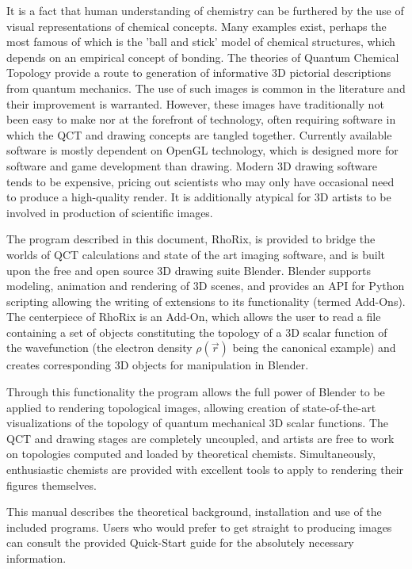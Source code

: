\documentclass{tufte-book}
\newcommand{\programName}{RhoRix}
\begin{document}
It is a fact that human understanding of chemistry can be furthered by the use of visual representations of chemical concepts. Many examples exist, perhaps the most famous of which is the 'ball and stick' model of chemical structures, which depends on an empirical concept of bonding. The theories of Quantum Chemical Topology provide a route to generation of informative 3D pictorial descriptions from quantum mechanics. The use of such images is common in the literature and their improvement is warranted.
However, these images have traditionally not been easy to make nor at the forefront of technology, often requiring software in which the QCT and drawing concepts are tangled together. Currently available software is mostly dependent on OpenGL technology, which is designed more for software and game development than drawing. Modern 3D drawing software tends to be expensive, pricing out scientists who may only have occasional need to produce a high-quality render. It is additionally atypical for 3D artists to be involved in production of scientific images.
\par{}
The program described in this document, \programName{}, is provided to bridge the worlds of QCT calculations and state of the art imaging software, and is built upon the free and open source 3D drawing suite Blender. Blender supports modeling, animation and rendering of 3D scenes, and provides an API for Python scripting allowing the writing of extensions to its functionality (termed Add-Ons). The centerpiece of \programName{} is an Add-On, which allows the user to read a file containing a set of objects constituting the topology of a 3D scalar function of the wavefunction (the electron density $\rho(\vec{r})$ being the canonical example) and creates corresponding 3D objects for manipulation in Blender.
\par{}
Through this functionality the program allows the full power of Blender to be applied to rendering topological images,
allowing creation of state-of-the-art visualizations of the topology of quantum mechanical 3D scalar functions. The QCT and drawing stages are completely uncoupled, and artists are free to work on topologies computed and loaded by theoretical chemists. Simultaneously, enthusiastic chemists are provided with excellent tools to apply to rendering their figures themselves.

This manual describes the theoretical background, installation and use of the included programs. Users who would prefer to get straight to producing images can consult the provided Quick-Start guide for the absolutely necessary information.
\end{document}
